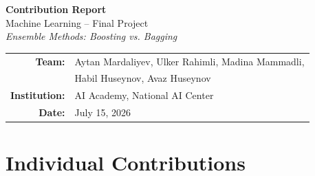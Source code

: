 \documentclass[11pt,a4paper]{article}
\begin{document}
\begin{center}
    {\Large\bfseries Contribution Report}\\[0.4em]
    {\large Machine Learning -- Final Project}\\
    {\itshape Ensemble Methods: Boosting vs. Bagging}\\[0.8em]
    \begin{tabular}{rl}
        \textbf{Team:} & Aytan Mardaliyev, Ulker Rahimli, Madina Mammadli, \\
                       & Habil Huseynov, Avaz Huseynov \\
        \textbf{Institution:} & AI Academy, National AI Center \\
        \textbf{Date:} & July 15, 2026 \\
    \end{tabular}
\end{center}

\section*{Individual Contributions}
\end{document}
